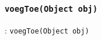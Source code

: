 \subsubsection{\texttt{voegToe(Object obj)}}
\begin{frame}[fragile]{\dsarraylist{}: \texttt{voegToe(Object obj)}}
\begin{methodexample}
\begin{center}
\begin{animateinline}{1}
\newframe
{}\newframe
{}\newframe
{}\newframe
{}\newframe
{}\newframe
{}\newframe
{}\newframe
{}
\end{animateinline}
\end{center}
\end{methodexample}
\end{frame}